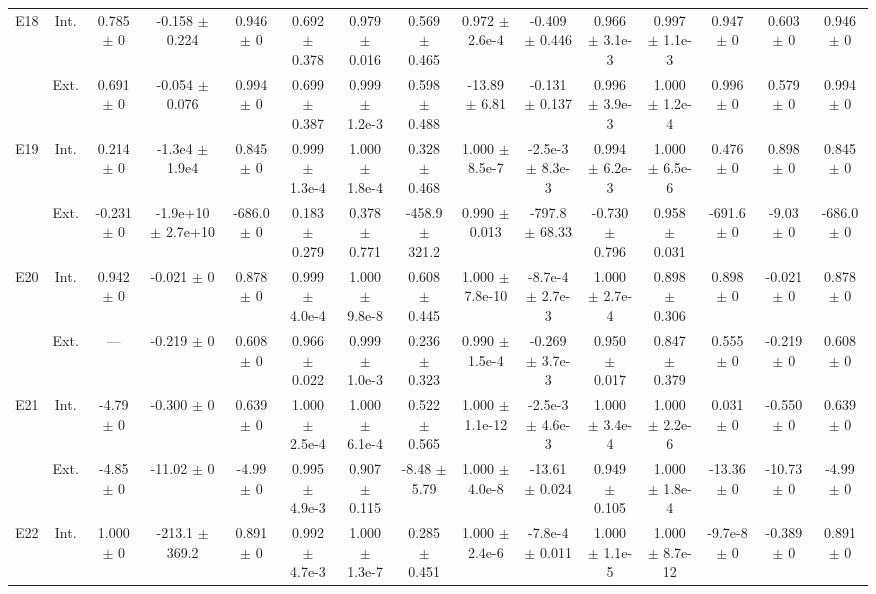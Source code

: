 \begin{table}[htbp]
{\begin{tabular}{@{}ccccccccccccccc@{}}
\cline{2-15}
\multirow{2}{*}{E18} & Int. & 0.785 $\pm$ 0 & -0.158 $\pm$ 0.224 & 0.946 $\pm$ 0 & 0.692 $\pm$ 0.378 & 0.979 $\pm$ 0.016 & 0.569 $\pm$ 0.465 & 0.972 $\pm$ 2.6e-4 & -0.409 $\pm$ 0.446 & 0.966 $\pm$ 3.1e-3 & 0.997 $\pm$ 1.1e-3 & 0.947 $\pm$ 0 & 0.603 $\pm$ 0 & 0.946 $\pm$ 0 \\
 & Ext. & 0.691 $\pm$ 0 & -0.054 $\pm$ 0.076 & 0.994 $\pm$ 0 & 0.699 $\pm$ 0.387 & 0.999 $\pm$ 1.2e-3 & 0.598 $\pm$ 0.488 & -13.89 $\pm$ 6.81 & -0.131 $\pm$ 0.137 & 0.996 $\pm$ 3.9e-3 & 1.000 $\pm$ 1.2e-4 & 0.996 $\pm$ 0 & 0.579 $\pm$ 0 & 0.994 $\pm$ 0 \\
\cline{2-15}
\multirow{2}{*}{E19} & Int. & 0.214 $\pm$ 0 & -1.3e4 $\pm$ 1.9e4 & 0.845 $\pm$ 0 & 0.999 $\pm$ 1.3e-4 & 1.000 $\pm$ 1.8e-4 & 0.328 $\pm$ 0.468 & 1.000 $\pm$ 8.5e-7 & -2.5e-3 $\pm$ 8.3e-3 & 0.994 $\pm$ 6.2e-3 & 1.000 $\pm$ 6.5e-6 & 0.476 $\pm$ 0 & 0.898 $\pm$ 0 & 0.845 $\pm$ 0 \\
 & Ext. & -0.231 $\pm$ 0 & -1.9e+10 $\pm$ 2.7e+10 & -686.0 $\pm$ 0 & 0.183 $\pm$ 0.279 & 0.378 $\pm$ 0.771 & -458.9 $\pm$ 321.2 & 0.990 $\pm$ 0.013 & -797.8 $\pm$ 68.33 & -0.730 $\pm$ 0.796 & 0.958 $\pm$ 0.031 & -691.6 $\pm$ 0 & -9.03 $\pm$ 0 & -686.0 $\pm$ 0 \\
\cline{2-15}
\multirow{2}{*}{E20} & Int. & 0.942 $\pm$ 0 & -0.021 $\pm$ 0 & 0.878 $\pm$ 0 & 0.999 $\pm$ 4.0e-4 & 1.000 $\pm$ 9.8e-8 & 0.608 $\pm$ 0.445 & 1.000 $\pm$ 7.8e-10 & -8.7e-4 $\pm$ 2.7e-3 & 1.000 $\pm$ 2.7e-4 & 0.898 $\pm$ 0.306 & 0.898 $\pm$ 0 & -0.021 $\pm$ 0 & 0.878 $\pm$ 0 \\
 & Ext. & --- & -0.219 $\pm$ 0 & 0.608 $\pm$ 0 & 0.966 $\pm$ 0.022 & 0.999 $\pm$ 1.0e-3 & 0.236 $\pm$ 0.323 & 0.990 $\pm$ 1.5e-4 & -0.269 $\pm$ 3.7e-3 & 0.950 $\pm$ 0.017 & 0.847 $\pm$ 0.379 & 0.555 $\pm$ 0 & -0.219 $\pm$ 0 & 0.608 $\pm$ 0 \\
\cline{2-15}
\multirow{2}{*}{E21} & Int. & -4.79 $\pm$ 0 & -0.300 $\pm$ 0 & 0.639 $\pm$ 0 & 1.000 $\pm$ 2.5e-4 & 1.000 $\pm$ 6.1e-4 & 0.522 $\pm$ 0.565 & 1.000 $\pm$ 1.1e-12 & -2.5e-3 $\pm$ 4.6e-3 & 1.000 $\pm$ 3.4e-4 & 1.000 $\pm$ 2.2e-6 & 0.031 $\pm$ 0 & -0.550 $\pm$ 0 & 0.639 $\pm$ 0 \\
 & Ext. & -4.85 $\pm$ 0 & -11.02 $\pm$ 0 & -4.99 $\pm$ 0 & 0.995 $\pm$ 4.9e-3 & 0.907 $\pm$ 0.115 & -8.48 $\pm$ 5.79 & 1.000 $\pm$ 4.0e-8 & -13.61 $\pm$ 0.024 & 0.949 $\pm$ 0.105 & 1.000 $\pm$ 1.8e-4 & -13.36 $\pm$ 0 & -10.73 $\pm$ 0 & -4.99 $\pm$ 0 \\
\cline{2-15}
\multirow{2}{*}{E22} & Int. & 1.000 $\pm$ 0 & -213.1 $\pm$ 369.2 & 0.891 $\pm$ 0 & 0.992 $\pm$ 4.7e-3 & 1.000 $\pm$ 1.3e-7 & 0.285 $\pm$ 0.451 & 1.000 $\pm$ 2.4e-6 & -7.8e-4 $\pm$ 0.011 & 1.000 $\pm$ 1.1e-5 & 1.000 $\pm$ 8.7e-12 & -9.7e-8 $\pm$ 0 & -0.389 $\pm$ 0 & 0.891 $\pm$ 0 \\

\end{tabular}}
\end{table}

